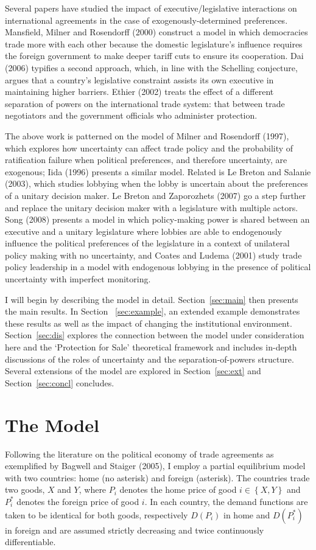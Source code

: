 \documentclass[10pt]{article}
\begin{document}
Several papers have studied the impact of executive/legislative interactions on international agreements in the case of exogenously-determined preferences. Mansfield, Milner and Rosendorff (2000) construct a model in which democracies trade more with each other because the domestic legislature's influence requires the foreign government to make deeper tariff cuts to ensure its cooperation. Dai (2006) typifies a second approach, which, in line with the Schelling conjecture, argues that a country's legislative constraint assists its own executive in maintaining higher barriers. Ethier (2002) treats the effect of a different separation of powers on the international trade system: that between trade negotiators and the government officials who administer protection.

The above work is patterned on the model of Milner and Rosendorff (1997), which explores how uncertainty can affect trade policy and the probability of ratification failure when political preferences, and therefore uncertainty, are exogenous;  Iida (1996) presents a similar model. Related is Le Breton and Salanie (2003), which studies lobbying when the lobby is uncertain about the preferences of a unitary decision maker. Le Breton and Zaporozhets (2007) go a step further and replace the unitary decision maker with a legislature with multiple actors. Song (2008) presents a model in which policy-making power is shared between an executive and a unitary legislature where lobbies are able to endogenously influence the political preferences of the legislature in a context of unilateral policy making with no uncertainty, and Coates and Ludema (2001) study trade policy leadership in a model with endogenous lobbying in the presence of political uncertainty with imperfect monitoring.

I will begin by describing the model in detail. Section~\ref{sec:main} then presents the main results. In Section~ \ref{sec:example}, an extended example demonstrates these results as well as the impact of changing the institutional environment. Section~\ref{sec:dis} explores the connection between the model under consideration here and the `Protection for Sale' theoretical framework and includes in-depth discussions of the roles of uncertainty and the separation-of-powers structure. Several extensions of the model are explored in Section~\ref{sec:ext} and Section~\ref{sec:concl} concludes.


\section{The Model}
\label{sec:model}
Following the literature on the political economy of trade agreements as exemplified by Bagwell and Staiger (2005), I employ a partial equilibrium model with two countries: home (no asterisk) and foreign (asterisk). The countries trade two goods, $X$ and $Y$, where $P_i$ denotes the home price of good $i \in \left\{X,Y\right\}$ and $P_i^*$ denotes the foreign price of good $i$. In each country, the demand functions are taken to be identical for both goods, respectively $D(P_i)$ in home and $D(P_i^*)$ in foreign and are assumed strictly decreasing and twice continuously differentiable.
\end{document}
